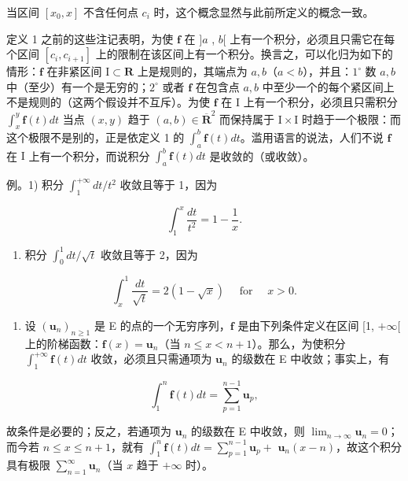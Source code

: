 当区间 \([x_0, x]\) 不含任何点 \(c_i\) 时，这个概念显然与此前所定义的概念一致。

定义 1 之前的这些注记表明，为使 \(\mathbf{f}\) 在 \(]a\) , \(b[\) 上有一个积分，必须且只需它在每个区间 \([c_i, c_{i+1}]\) 上的限制在该区间上有一个积分。换言之，可以化归为如下的情形：\(\mathbf{f}\) 在非紧区间 \(\mathrm{I} \subset \mathbf{R}\) 上是规则的，其端点为 \(a, b\)（\(a < b\)），并且：\(1^\circ\) 数 \(a, b\) 中（至少）有一个是无穷的；\(2^\circ\) 或者 \(\mathbf{f}\) 在包含点 \(a, b\) 中至少一个的每个紧区间上不是规则的（这两个假设并不互斥）。为使 \(\mathbf{f}\) 在 \(\mathrm{I}\) 上有一个积分，必须且只需积分 \(\int_x^y \mathbf{f}(t) dt\) 当点 \((x, y)\) 趋于 \((a, b) \in \overline{\mathbf{R}}^2\) 而保持属于 \(\mathrm{I} \times \mathrm{I}\) 时趋于一个极限：而这个极限不是别的，正是依定义 1 的 \(\int_a^b \mathbf{f}(t) dt\)。滥用语言的说法，人们不说 \(\mathbf{f}\) 在 \(\mathrm{I}\) 上有一个积分，而说积分 \(\int_a^b \mathbf{f}(t) dt\) 是收敛的（或收敛）。

例。1) 积分 \(\int_{1}^{+\infty} dt / t^{2}\) 收敛且等于 1，因为

\[
\int_ {1} ^ {x} \frac {d t}{t ^ {2}} = 1 - \frac {1}{x}.
\]

\begin{enumerate}
\def\labelenumi{\arabic{enumi})}
\setcounter{enumi}{1}
\tightlist
\item
  积分 \(\int_0^1 dt / \sqrt{t}\) 收敛且等于 2，因为
\end{enumerate}

\[
\int_ {x} ^ {1} \frac {d t}{\sqrt {t}} = 2 (1 - \sqrt {x}) \quad \text { for } \quad x > 0.
\]

\begin{enumerate}
\def\labelenumi{\arabic{enumi})}
\setcounter{enumi}{2}
\tightlist
\item
  设 \((\mathbf{u}_n)_{n\geqslant 1}\) 是 E 的点的一个无穷序列，\(\mathbf{f}\) 是由下列条件定义在区间 {[}1, \(+\infty[\) 上的阶梯函数：\(\mathbf{f}(x) = \mathbf{u}_n\)（当 \(n\leqslant x < n + 1\)）。那么，为使积分 \(\int_1^{+\infty}\mathbf{f}(t)dt\) 收敛，必须且只需通项为 \(\mathbf{u}_n\) 的级数在 E 中收敛；事实上，有
\end{enumerate}

\[
\int_ {1} ^ {n} \mathbf {f} (t) d t = \sum_ {p = 1} ^ {n - 1} \mathbf {u} _ {p},
\]

故条件是必要的；反之，若通项为 \(\mathbf{u}_n\) 的级数在 E 中收敛，则 \(\lim_{n\to \infty}\mathbf{u}_n = 0\)；而今若 \(n\leqslant x\leqslant n + 1\)，就有 \(\int_1^n\mathbf{f}(t)dt = \sum_{p = 1}^{n - 1}\mathbf{u}_p +\) \(\mathbf{u}_n(x - n)\)，故这个积分具有极限 \(\sum_{n = 1}^{\infty}\mathbf{u}_n\)（当 \(x\) 趋于 \(+\infty\) 时）。

